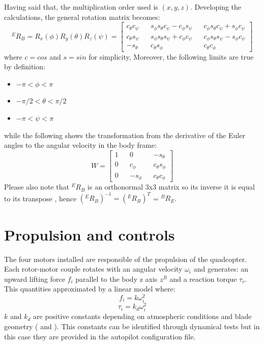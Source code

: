 \noindent
Having said that, the multiplication order used is $(x , y , z)$. Developing the calculations, the general rotation matrix becomes:\begin{equation}
{}^ER_B = R_x(\phi)R_y(\theta)R_z(\psi) = \begin{bmatrix} 
c_\theta c_\psi && s_\phi s_\theta c_\psi - c_\phi s _\psi &&  c_\phi s_\theta c_\psi + s_\phi c _\psi \\
c_\theta s_\psi&& s_\phi s_\theta s_\psi + c_\phi c _\psi && c_\phi s_\theta  s_\psi - s_\phi c _\psi \\
-s_\theta && c_\theta s_\phi  &&  c_\theta c_\phi 
\end{bmatrix}
\label{eq:rotmatrix}
\end{equation}where $c = cos$ and $s = sin$ for simplicity, Moreover, the following limits are true by definition: \begin{itemize}
\item $ -\pi < \phi < \pi$
\item $ -\pi/2 < \theta < \pi/2$
\item $ -\pi < \psi < \pi$
\end{itemize}
while the following shows the transformation from the derivative of the Euler angles to the angular velocity in the body frame\cite{Friis2009}:
\begin{equation}
W = \begin{bmatrix} 
1 && 0 && -s_\theta\\
0 && c_\phi && c_\theta s_\phi \\
0 && -s_\phi && c_\theta c_\phi
\end{bmatrix}
\end{equation}
Please also note that ${}^ER_B$ is an orthonormal 3x3 matrix so its inverse it is equal to its transpose \cite{Khalil2004}, hence $({}^ER_B)^{-1} = ({}^ER_B)^{T}$ = ${}^BR_E$.

\section{Propulsion and controls}
\label{sec:propulsion}

The four motors installed are responsible of the propulsion of the quadcopter. Each rotor-motor couple rotates with an angular velocity $\omega_i$ and generates: an upward lifting force $f_i$ parallel to the body z axis $z^B$ and a reaction torque $\tau_r$. This quantities approximated by a linear model where: \begin{equation}
f_i = k \omega_i ^ 2
\label{eq:fi}
\end{equation}
\begin{equation}
\tau_i = k_d \omega_i ^ 2
\label{eq:taui}
\end{equation}
$k$ and $k_d$ are positive constants depending on atmospheric conditions and blade geometry (\cite{Mahony2012} and \cite{Falchi2014}). This constants can be identified through dynamical tests but in this case they are provided in the autopilot configuration file.\\

